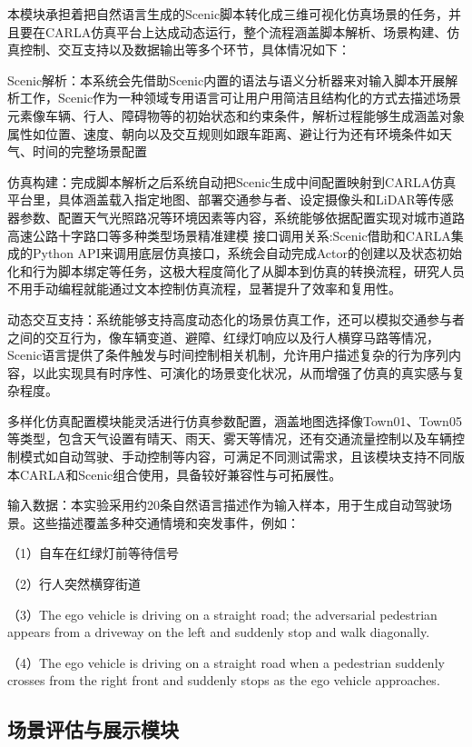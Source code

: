 本模块承担着把自然语言生成的Scenic脚本转化成三维可视化仿真场景的任务，并且要在CARLA仿真平台上达成动态运行，整个流程涵盖脚本解析、场景构建、仿真控制、交互支持以及数据输出等多个环节，具体情况如下：

Scenic解析：本系统会先借助Scenic内置的语法与语义分析器来对输入脚本开展解析工作，Scenic作为一种领域专用语言可让用户用简洁且结构化的方式去描述场景元素像车辆、行人、障碍物等的初始状态和约束条件，解析过程能够生成涵盖对象属性如位置、速度、朝向以及交互规则如跟车距离、避让行为还有环境条件如天气、时间的完整场景配置

仿真构建：完成脚本解析之后系统自动把Scenic生成中间配置映射到CARLA仿真平台里，具体涵盖载入指定地图、部署交通参与者、设定摄像头和LiDAR等传感器参数、配置天气光照路况等环境因素等内容，系统能够依据配置实现对城市道路高速公路十字路口等多种类型场景精准建模
接口调用关系:Scenic借助和CARLA集成的Python API来调用底层仿真接口，系统会自动完成Actor的创建以及状态初始化和行为脚本绑定等任务，这极大程度简化了从脚本到仿真的转换流程，研究人员不用手动编程就能通过文本控制仿真流程，显著提升了效率和复用性。

动态交互支持：系统能够支持高度动态化的场景仿真工作，还可以模拟交通参与者之间的交互行为，像车辆变道、避障、红绿灯响应以及行人横穿马路等情况，Scenic语言提供了条件触发与时间控制相关机制，允许用户描述复杂的行为序列内容，以此实现具有时序性、可演化的场景变化状况，从而增强了仿真的真实感与复杂程度。

多样化仿真配置模块能灵活进行仿真参数配置，涵盖地图选择像Town01、Town05等类型，包含天气设置有晴天、雨天、雾天等情况，还有交通流量控制以及车辆控制模式如自动驾驶、手动控制等内容，可满足不同测试需求，且该模块支持不同版本CARLA和Scenic组合使用，具备较好兼容性与可拓展性。


输入数据：本实验采用约20条自然语言描述作为输入样本，用于生成自动驾驶场景。这些描述覆盖多种交通情境和突发事件，例如：

（1）自车在红绿灯前等待信号

（2）行人突然横穿街道

（3）The ego vehicle is driving on a straight road; the adversarial pedestrian appears from a driveway on the left and suddenly stop and walk diagonally.

（4）The ego vehicle is driving on a straight road when a pedestrian suddenly crosses from the right front and suddenly stops as the ego vehicle approaches.

\subsection{场景评估与展示模块}

